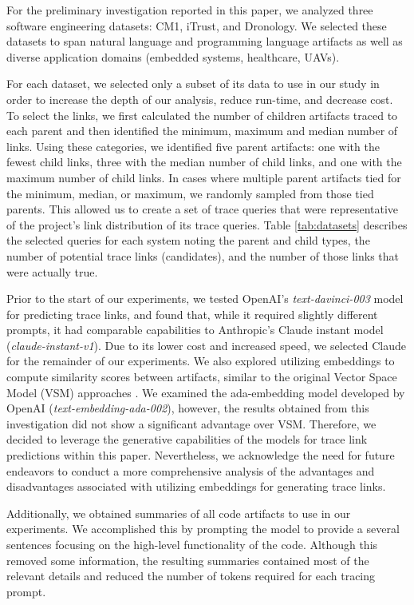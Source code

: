 For the preliminary investigation reported in this paper, we analyzed three software engineering datasets: CM1, iTrust, and Dronology. We selected these datasets to span natural language and programming language artifacts as well as diverse application domains (embedded systems, healthcare, UAVs). 

For each dataset, we selected only a subset of its data to use in our study in order to increase the depth of our analysis, reduce run-time, and decrease cost. To select the links, we first calculated the number of children artifacts traced to each parent and then identified the minimum, maximum and median number of links. Using these categories, we identified five parent artifacts: one with the fewest child links, three with the median number of child links, and one with the maximum number of child links. In cases where multiple parent artifacts tied for the minimum, median, or maximum, we randomly sampled from those tied parents. This allowed us to create a set of trace queries that were representative of the project's link distribution of its trace queries. Table \ref{tab:datasets} describes the selected queries for each system noting the parent and child types, the number of potential trace links (candidates), and the number of those links that were actually true.

Prior to the start of our experiments, we tested OpenAI's \emph{text-davinci-003} model for predicting trace links, and found that, while it required slightly different prompts, it had comparable capabilities to Anthropic's Claude instant model (\emph{claude-instant-v1}). Due to its lower cost and increased speed, we selected Claude for the remainder of our experiments. We also explored utilizing embeddings to compute similarity scores between artifacts, similar to the original Vector Space Model (VSM) approaches \cite{traceability_vsm}. We examined the ada-embedding model developed by OpenAI (\emph{text-embedding-ada-002}), however, the results obtained from this investigation did not show a significant advantage over VSM. Therefore, we decided to leverage the generative capabilities of the models for trace link predictions within this paper. Nevertheless, we acknowledge the need for future endeavors to conduct a more comprehensive analysis of the advantages and disadvantages associated with utilizing embeddings for generating trace links.

 Additionally, we obtained summaries of all code artifacts to use in our experiments. We accomplished this by prompting the model to provide a several sentences focusing on the high-level functionality of the code. Although this removed some information, the resulting summaries contained most of the relevant details and reduced the number of tokens required for each tracing prompt.

